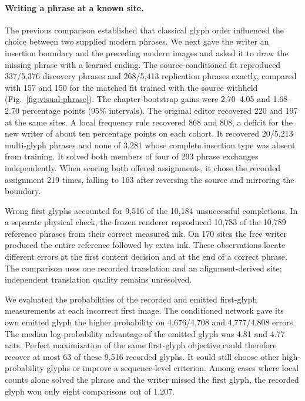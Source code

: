 \paragraph{Writing a phrase at a known site.}
The previous comparison established that classical glyph order influenced the choice between two supplied modern phrases. We next gave the writer an insertion boundary and the preceding modern images and asked it to draw the missing phrase with a learned ending. The source-conditioned fit reproduced 337/5,376 discovery phrases and 268/5,413 replication phrases exactly, compared with 157 and 150 for the matched fit trained with the source withheld (Fig.~\ref{fig:visual-phrase}). The chapter-bootstrap gains were 2.70--4.05 and 1.68--2.70 percentage points (95\% intervals). The original editor recovered 220 and 197 at the same sites. A local frequency rule recovered 868 and 808, a deficit for the new writer of about ten percentage points on each cohort. It recovered 20/5,213 multi-glyph phrases and none of 3,281 whose complete insertion type was absent from training. It solved both members of four of 293 phrase exchanges independently. When scoring both offered assignments, it chose the recorded assignment 219 times, falling to 163 after reversing the source and mirroring the boundary.

Wrong first glyphs accounted for 9,516 of the 10,184 unsuccessful completions. In a separate physical check, the frozen renderer reproduced 10,783 of the 10,789 reference phrases from their correct measured ink. On 170 sites the free writer produced the entire reference followed by extra ink. These observations locate different errors at the first content decision and at the end of a correct phrase. The comparison uses one recorded translation and an alignment-derived site; independent translation quality remains unresolved.

We evaluated the probabilities of the recorded and emitted first-glyph measurements at each incorrect first image. The conditioned network gave its own emitted glyph the higher probability on 4,676/4,708 and 4,777/4,808 errors. The median log-probability advantage of the emitted glyph was 4.81 and 4.77 nats. Perfect maximization of the same first-glyph objective could therefore recover at most 63 of these 9,516 recorded glyphs. It could still choose other high-probability glyphs or improve a sequence-level criterion. Among cases where local counts alone solved the phrase and the writer missed the first glyph, the recorded glyph won only eight comparisons out of 1,207.
